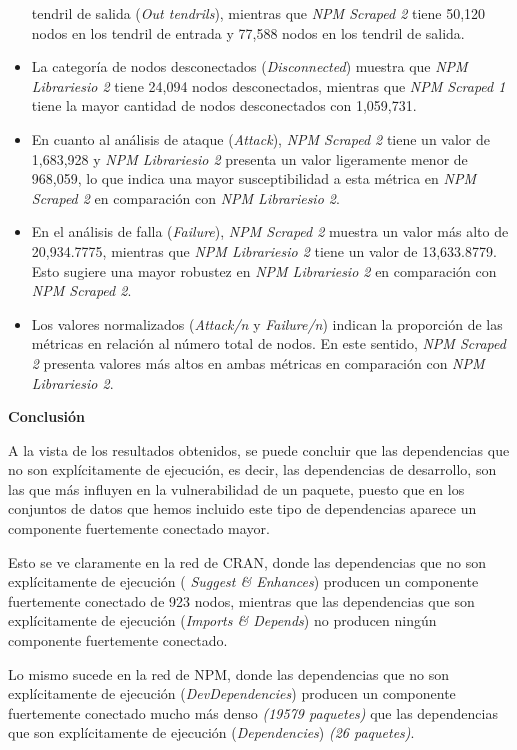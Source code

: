 \begin{itemize}
          tendril de salida (\textit{Out tendrils}), mientras que \textit{NPM Scraped 2} tiene
          50,120 nodos en los tendril de entrada y 77,588 nodos en los tendril de salida.
    \item La categoría de nodos desconectados (\textit{Disconnected}) muestra que
          \textit{NPM Librariesio 2} tiene 24,094 nodos desconectados, mientras que
          \textit{NPM Scraped 1} tiene la mayor cantidad de nodos desconectados con
          1,059,731.
    \item En cuanto al análisis de ataque (\textit{Attack}), \textit{NPM Scraped 2} tiene
          un valor de 1,683,928 y \textit{NPM Librariesio 2} presenta un valor ligeramente menor
          de 968,059, lo que indica una mayor susceptibilidad a esta métrica en \textit{NPM Scraped 2}
          en comparación con \textit{NPM Librariesio 2}.
    \item En el análisis de falla (\textit{Failure}), \textit{NPM Scraped 2} muestra un valor
          más alto de 20,934.7775, mientras que \textit{NPM Librariesio 2} tiene un valor de
          13,633.8779. Esto sugiere una mayor robustez en \textit{NPM Librariesio 2} en comparación
          con \textit{NPM Scraped 2}.
    \item Los valores normalizados (\textit{Attack/n} y \textit{Failure/n}) indican la
          proporción de las métricas en relación al número total de nodos. En este sentido,
          \textit{NPM Scraped 2} presenta valores más altos en ambas métricas en comparación
          con \textit{NPM Librariesio 2}.
\end{itemize}

\textbf{Conclusión}

A la vista de los resultados obtenidos, se puede concluir que las dependencias que no son explícitamente de
ejecución, es decir, las dependencias de desarrollo, son las que más influyen en la vulnerabilidad de un paquete, puesto
que en los conjuntos de datos que hemos incluido este tipo de dependencias aparece un componente fuertemente conectado mayor.

Esto se ve claramente en la red de CRAN, donde las dependencias que no son explícitamente de ejecución (\textit{ Suggest \& Enhances})
producen un componente fuertemente conectado de 923 nodos, mientras que las dependencias que son explícitamente de ejecución
(\textit{Imports \& Depends}) no producen ningún componente fuertemente conectado.

Lo mismo sucede en la red de NPM, donde las dependencias que no son explícitamente de ejecución (\textit{DevDependencies})
producen un componente fuertemente conectado mucho más denso \textit{(19579 paquetes)} que las dependencias que son explícitamente de ejecución
(\textit{Dependencies}) \textit{(26 paquetes)}.

